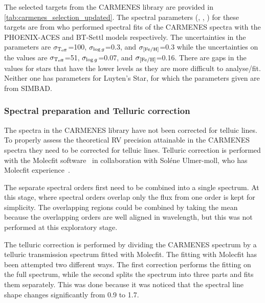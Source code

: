 The selected targets from the {CARMENES} library are provided in \cref{tab:carmenes_selection_updated}.
The spectral parameters (\Teff{}, \Logg{}, \feh{}) for these targets are from \citet{passegger_carmenes_2018, rajpurohit_exploring_2018} who performed spectral fits of the {CARMENES} spectra with the {PHOENIX-ACES} and {BT-Settl} models respectively.
The uncertainties in the \citet{rajpurohit_exploring_2018} parameters are \(\sigma_{\textrm{T}_{\mathrm{eff}}{}}\)=100\K{}, \(\sigma_{\log{g}{}}\)=0.3, and \(\sigma_{\feh{}}\)=0.3 while the uncertainties on the 
\citet{passegger_carmenes_2018} values are \(\sigma_{\textrm{T}_{\mathrm{eff}}{}}\)=51\K{}, \(\sigma_{\log{g}{}}\)=0.07, and \(\sigma_{\feh{}}\)=0.16.
There are gaps in the \citet{passegger_carmenes_2018} values for stars that have the lower \snr{} levels as they are more difficult to analyse/fit.
Neither one has parameters for Luyten's Star, for which the parameters given are from {SIMBAD}.

\begin{landscape}
    
\end{landscape}


\subsubsection{Spectral preparation and Telluric correction}
\label{subsec:prepatation_on_carmenes}
The spectra in the  {CARMENES} library have not been corrected for telluic lines.
To properly assess the theoretical {RV} precision attainable in the {CARMENES} spectra they need to be corrected for telluic lines.
Telluric correction is performed with the {Molecfit} software~\citep{smette_molecfit_2015} in collaboration with Sol\'ene Ulmer-moll, who has {Molecfit} experience~\citep{ulmer-moll_telluric_2018}.

The separate spectral orders first need to be combined into a single spectrum.
At this stage, where spectral orders overlap only the flux from one order is kept for simplicity.
The overlapping regions could be combined by taking the mean because the overlapping orders are well aligned in wavelength, but this was not performed at this exploratory stage.

The telluric correction is performed by dividing the {CARMENES} spectrum by a telluric transmission spectrum fitted with {Molecfit}.
The fitting with {Molecfit} has been attempted two different ways.
The first correction performs the fitting on the full \nir{} spectrum, while the second splits the spectrum into three parts and fits them separately.
This was done because it was noticed that the spectral line shape changes significantly from 0.9\um{} to 1.7\um{}.

